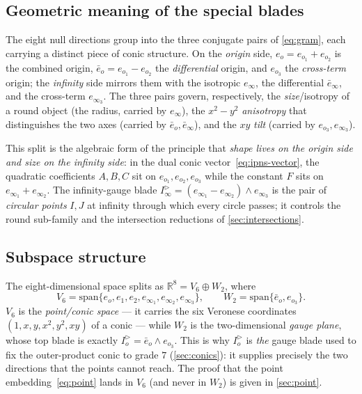 \documentclass{birkjour}
\theoremstyle{definition}
\theoremstyle{remark}
\newcommand{\eo}{e_o}
\newcommand{\einf}{e_\infty}
\newcommand{\eobar}{\bar e_o}
\newcommand{\einfbar}{\bar e_\infty}
\newcommand{\Iod}{I_o^{\triangleright}}      %
\newcommand{\Iinfd}{I_\infty^{\triangleright}}%
\newcommand{\joinp}{\wedge}
\begin{document}
\subsection{Geometric meaning of the special blades}
\label{sec:blade-meaning}
The eight null directions group into the three conjugate pairs of \cref{eq:gram},
each carrying a distinct piece of conic structure. On the \emph{origin} side,
$\eo = e_{o_1}+e_{o_2}$ is the combined origin, $\eobar = e_{o_1}-e_{o_2}$ the
\emph{differential} origin, and $e_{o_3}$ the \emph{cross-term} origin; the
\emph{infinity} side mirrors them with the isotropic $\einf$, the differential
$\einfbar$, and the cross-term $e_{\infty_3}$. The three pairs govern,
respectively, the \emph{size}/isotropy of a round object (the radius, carried by
$\einf$), the $x^2-y^2$ \emph{anisotropy} that distinguishes the two axes (carried
by $\eobar,\einfbar$), and the $xy$ \emph{tilt} (carried by $e_{o_3},e_{\infty_3}$).

This split is the algebraic form of the principle that \emph{shape lives on the
origin side and size on the infinity side}: in the dual conic
vector~\eqref{eq:ipns-vector}, the quadratic coefficients $A,B,C$ sit on
$e_{o_1},e_{o_2},e_{o_3}$ while the constant $F$ sits on $e_{\infty_1}+e_{\infty_2}$.
The infinity-gauge blade $\Iinfd=(e_{\infty_1}-e_{\infty_2})\joinp e_{\infty_3}$ is
the pair of \emph{circular points} $I,J$ at infinity through which every circle
passes; it controls the round sub-family and the intersection reductions of
\cref{sec:intersections}.

\subsection{Subspace structure}
\label{sec:subspace}
The eight-dimensional space splits as $\mathbb{R}^8 = V_6 \oplus W_2$, where
\begin{equation}\label{eq:V6-W2}
  V_6 = \mathrm{span}\{\eo,e_1,e_2,e_{\infty_1},e_{\infty_2},e_{\infty_3}\},
  \qquad
  W_2 = \mathrm{span}\{\eobar, e_{o_3}\}.
\end{equation}
$V_6$ is the \emph{point/conic space} --- it carries the six Veronese coordinates
$(1,x,y,x^2,y^2,xy)$ of a conic --- while $W_2$ is the two-dimensional
\emph{gauge plane}, whose top blade is exactly $\Iod = \eobar\joinp e_{o_3}$. This
is why $\Iod$ is \emph{the} gauge blade used to fix the outer-product conic to
grade $7$ (\cref{sec:conics}): it supplies precisely the two directions that the
points cannot reach. The proof that the point
embedding~\eqref{eq:point} lands in $V_6$ (and never in $W_2$) is given in
\cref{sec:point}.
\end{document}
